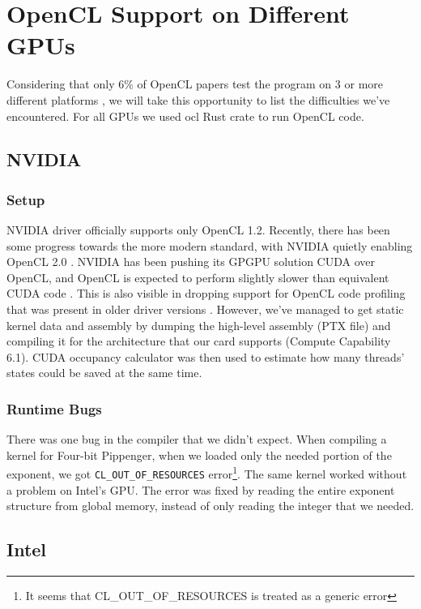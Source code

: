 \section{OpenCL Support on Different GPUs}

Considering that only 6\% of OpenCL papers test the program on 3 or more different platforms \cite{sorensen2016hitchhiker}, we will take this opportunity to list the difficulties we've encountered. For all GPUs we used ocl Rust crate to run OpenCL code.

\subsection{NVIDIA}
\subsubsection{Setup}
NVIDIA driver officially supports only OpenCL 1.2. Recently, there has been some progress towards the more modern standard, with NVIDIA quietly enabling OpenCL 2.0 \cite{nvidiareleasenotes}. NVIDIA has been pushing its GPGPU solution CUDA over OpenCL, and OpenCL is expected to perform slightly slower than equivalent CUDA code \cite{fang2011comprehensive, karimi2010performance}. This is also visible in dropping support for OpenCL code profiling that was present in older driver versions \cite{nvidiaprofiler}. However, we've managed to get static kernel data and assembly by dumping the high-level assembly (PTX file) and compiling it for the architecture that our card supports (Compute Capability 6.1). CUDA occupancy calculator was then used to estimate how many threads' states could be saved at the same time.
\subsubsection{Runtime Bugs}
There was one bug in the compiler that we didn't expect. When compiling a kernel for Four-bit Pippenger, when we loaded only the needed portion of the exponent, we got \texttt{CL\_OUT\_OF\_RESOURCES} error\footnote{It seems that CL\_OUT\_OF\_RESOURCES is treated as a generic error}. The same kernel worked without a problem on Intel's GPU. The error was fixed by reading the entire exponent structure from global memory, instead of only reading the integer that we needed.

\subsection{Intel}

